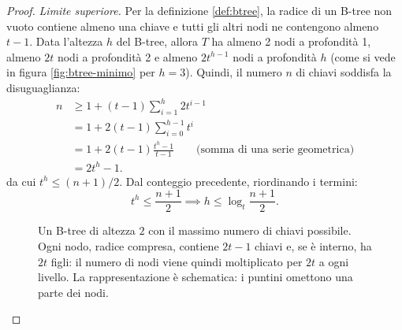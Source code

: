 \begin{proof}
    \emph{Limite superiore.} Per la definizione \ref{def:btree}, la radice di un B-tree non vuoto contiene almeno una chiave e tutti gli altri nodi ne contengono almeno $t-1$. Data l'altezza $h$ del B-tree, allora $T$ ha almeno 2 nodi a profondità 1, almeno $2t$ nodi a profondità 2 e almeno $2t^{h-1}$ nodi a profondità $h$ (come si vede in figura \ref{fig:btree-minimo} per $h = 3$). Quindi, il numero $n$ di chiavi soddisfa la disuguaglianza:
    \begin{align*}
        n &\ge 1 + (t-1) \sum_{i=1}^h 2t^{i-1} \\
            &= 1 + 2(t-1) \sum_{i=0}^{h-1} t^i \\
            &= 1 + 2(t-1) \frac{t^h - 1}{t - 1} \qquad\text{(somma di una serie geometrica)} \\
            &= 2t^h - 1.
    \end{align*}
    da cui $t^h \le (n+1)/2$. Dal conteggio precedente, riordinando i termini:
    \[
    t^h \le \frac{n+1}{2} \implies h \le \log_t \frac{n+1}{2}.
    \]

\begin{figure}[htbp]
\centering
{}
\caption{Un B-tree di altezza $2$ con il massimo numero di chiavi possibile. Ogni nodo, radice compresa, contiene $2t-1$ chiavi e, se è interno, ha $2t$ figli: il numero di nodi viene quindi moltiplicato per $2t$ a ogni livello. La rappresentazione è schematica: i puntini omettono una parte dei nodi.}
\label{fig:btree-massimo}
\end{figure}


\end{proof}
